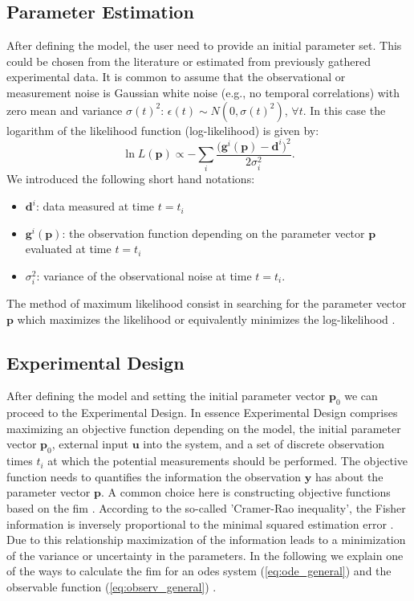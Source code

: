 \documentclass[10pt,A4paper]{article}
\newcommand{\mbu}{\mathbf{u}}
\newcommand{\mbp}{\mathbf{p}}
\newcommand{\mby}{\mathbf{y}}
\newcommand{\mbd}{\mathbf{d}}
\begin{document}
\subsection*{Parameter Estimation}
After defining the model, the user need to provide an initial parameter set.  
This could be chosen from the literature or estimated from previously gathered experimental data. 
It is common to assume that the observational or measurement noise is Gaussian white noise (e.g., no temporal correlations) with zero mean and variance $\sigma(t)^2$: $\epsilon(t) \sim N(0, \sigma(t)^2)$, $\forall t$. 
In this case the logarithm of the likelihood function (log-likelihood) is given by:
\begin{equation}
    \ln L(\mbp) \propto - \sum_{i}\frac{ \big(\mathbf{g}^{i}(\mbp) - \mbd^{i}\big)^2}{2 \sigma_{i}^2}.
    \label{eq:likelihood_Gaussian}
\end{equation}
We introduced the following short hand notations: 
\begin{itemize}
\item $\mbd^{i}$: data measured at time $t=t_i$
\item $\mathbf{g}^{i}(\mbp)$: the observation function depending on the parameter vector $\mbp$ evaluated at time $t=t_i$
\item $\sigma_{i}^2$: variance of the observational noise at time $t=t_i$.
\end{itemize}
The method of maximum likelihood consist in searching for the parameter vector $\mbp$ which maximizes the likelihood or equivalently minimizes the log-likelihood \cite{gaborRobustEfficient2015}. 

%
\subsection*{Experimental Design}
After defining the model and setting the initial parameter vector $\mbp_0$ we can proceed to the Experimental Design. 
In essence Experimental Design comprises maximizing an objective function depending on the model, the initial parameter vector $\mbp_0$, external input $\mbu$ into the system, and a set of discrete observation times $t_i$ at which the potential measurements should be performed. 
The objective function needs to quantifies the information the observation $\mby$ has about the parameter vector $\mbp$. 
A common choice here is constructing objective functions based on the \ac{fim} \cite{lyTutorialFisher2017}. 
According to the so-called 'Cramer-Rao inequality', the Fisher information is inversely proportional to the minimal squared estimation error \cite{friedenExploratoryData2010}. 
Due to this relationship maximization of the information leads to a minimization of the variance or uncertainty in the parameters. 
In the following we explain one of the ways to calculate the \acl{fim} for an \acp{ode} system (\ref{eq:ode_general}) and the observable function (\ref{eq:observ_general}) \cite{lyTutorialFisher2017}.
\end{document}
